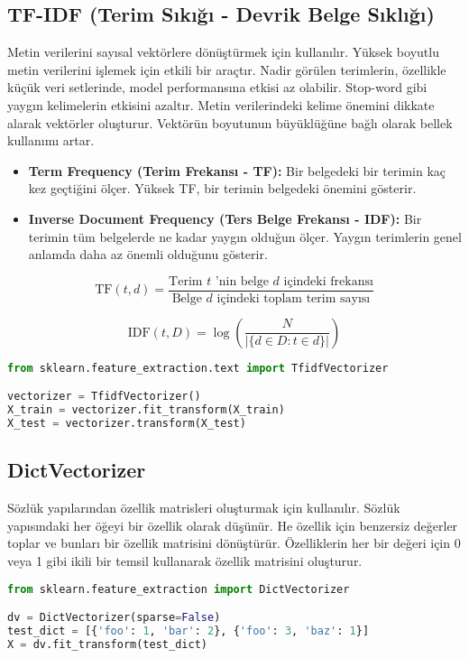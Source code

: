 \subsection{TF-IDF (Terim Sıkığı - Devrik Belge Sıklığı)}
Metin verilerini sayısal vektörlere dönüştürmek için kullanılır. Yüksek boyutlu metin verilerini işlemek için etkili bir araçtır. Nadir görülen terimlerin, özellikle küçük veri setlerinde, model performansına etkisi az olabilir. Stop-word gibi yaygın kelimelerin etkisini azaltır. Metin verilerindeki kelime önemini dikkate alarak vektörler oluşturur. Vektörün boyutunun büyüklüğüne bağlı olarak bellek kullanımı artar.

\begin{itemize}
    \item \textbf{Term Frequency (Terim Frekansı - TF):} Bir belgedeki bir terimin kaç kez geçtiğini ölçer. Yüksek TF, bir terimin belgedeki önemini gösterir.
    \item \textbf{Inverse Document Frequency (Ters Belge Frekansı - IDF):} Bir terimin tüm belgelerde ne kadar yaygın olduğun ölçer. Yaygın terimlerin genel anlamda daha az önemli olduğunu gösterir.
\end{itemize}

\[\text{TF}(t, d) = \frac{\text{Terim } t \text{ 'nin belge } d \text{ içindeki frekansı}}{\text{Belge } d \text{ içindeki toplam terim sayısı}}\]

\[\text{IDF}(t, D) = \log\left(\frac{N}{|\{d \in D : t \in d\}|}\right) \]

\begin{lstlisting}[language=Python, caption="Scikit-learn'de TF-IDF kullanımı."]
from sklearn.feature_extraction.text import TfidfVectorizer

vectorizer = TfidfVectorizer()
X_train = vectorizer.fit_transform(X_train)
X_test = vectorizer.transform(X_test)
\end{lstlisting}

\subsection{DictVectorizer}
Sözlük yapılarından özellik matrisleri oluşturmak için kullanılır. Sözlük yapısındaki her öğeyi bir özellik olarak düşünür. He özellik için benzersiz değerler toplar ve bunları bir özellik matrisini dönüştürür. Özelliklerin her bir değeri için 0 veya 1 gibi ikili bir temsil kullanarak özellik matrisini oluşturur.

\begin{lstlisting}[language=Python, caption="Scikit-learn'de DictVectorizer kullanımı."]
from sklearn.feature_extraction import DictVectorizer

dv = DictVectorizer(sparse=False)
test_dict = [{'foo': 1, 'bar': 2}, {'foo': 3, 'baz': 1}]
X = dv.fit_transform(test_dict)
\end{lstlisting}

